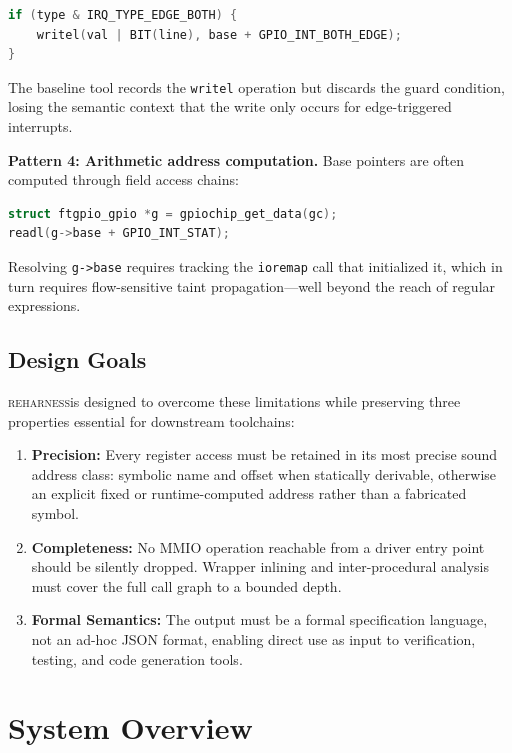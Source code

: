 \documentclass[sigplan, screen, review, anonymous]{acmart}
\newcommand{\reharness}{\textsc{reharness}}
\begin{document}
\begin{lstlisting}[language=C]
if (type & IRQ_TYPE_EDGE_BOTH) {
    writel(val | BIT(line), base + GPIO_INT_BOTH_EDGE);
}
\end{lstlisting}

The baseline tool records the \texttt{writel} operation but discards the guard condition, losing the semantic context that the write only occurs for edge-triggered interrupts.

\textbf{Pattern 4: Arithmetic address computation.} Base pointers are often computed through field access chains:

\begin{lstlisting}[language=C]
struct ftgpio_gpio *g = gpiochip_get_data(gc);
readl(g->base + GPIO_INT_STAT);
\end{lstlisting}

Resolving \texttt{g->base} requires tracking the \texttt{ioremap} call that initialized it, which in turn requires flow-sensitive taint propagation---well beyond the reach of regular expressions.

\subsection{Design Goals}

\reharness is designed to overcome these limitations while preserving three properties essential for downstream toolchains:

\begin{enumerate}
\item \textbf{Precision:} Every register access must be retained in its most precise sound address class: symbolic name and offset when statically derivable, otherwise an explicit fixed or runtime-computed address rather than a fabricated symbol.
\item \textbf{Completeness:} No MMIO operation reachable from a driver entry point should be silently dropped. Wrapper inlining and inter-procedural analysis must cover the full call graph to a bounded depth.
\item \textbf{Formal Semantics:} The output must be a formal specification language, not an ad-hoc JSON format, enabling direct use as input to verification, testing, and code generation tools.
\end{enumerate}

\section{System Overview}
\end{document}
